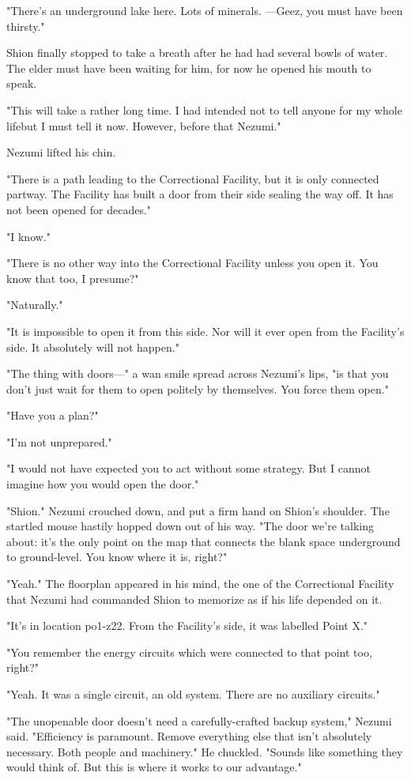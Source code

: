 "There's an underground lake here. Lots of minerals. ---Geez, you must
have been thirsty."

Shion finally stopped to take a breath after he had had several bowls of
water. The elder must have been waiting for him, for now he opened his
mouth to speak.

"This will take a rather long time. I had intended not to tell anyone
for my whole life\el but I must tell it now. However, before that\el 
Nezumi."

Nezumi lifted his chin.

"There is a path leading to the Correctional Facility, but it is only
connected partway. The Facility has built a door from their side sealing
the way off. It has not been opened for decades."

"I know."

"There is no other way into the Correctional Facility unless you open
it. You know that too, I presume?"

"Naturally."

"It is impossible to open it from this side. Nor will it ever open from
the Facility's side. It absolutely will not happen."

"The thing with doors---" a wan smile spread across Nezumi's lips, "is
that you don't just wait for them to open politely by themselves. You
force them open."

"Have you a plan?"

"I'm not unprepared."

"I would not have expected you to act without some strategy. But I
cannot imagine how you would open the door."

"Shion." Nezumi crouched down, and put a firm hand on Shion's shoulder.
The startled mouse hastily hopped down out of his way. "The door we're
talking about: it's the only point on the map that connects the blank
space underground to ground-level. You know where it is, right?"

"Yeah." The floorplan appeared in his mind, the one of the Correctional
Facility that Nezumi had commanded Shion to memorize as if his life
depended on it.

"It's in location po1-z22. From the Facility's side, it was labelled
Point X."

"You remember the energy circuits which were connected to that point
too, right?"

"Yeah. It was a single circuit, an old system. There are no auxiliary
circuits."

"The unopenable door doesn't need a carefully-crafted backup system,"
Nezumi said. "Efficiency is paramount. Remove everything else that isn't
absolutely necessary. Both people and machinery." He chuckled. "Sounds
like something they would think of. But this is where it works to our
advantage."

